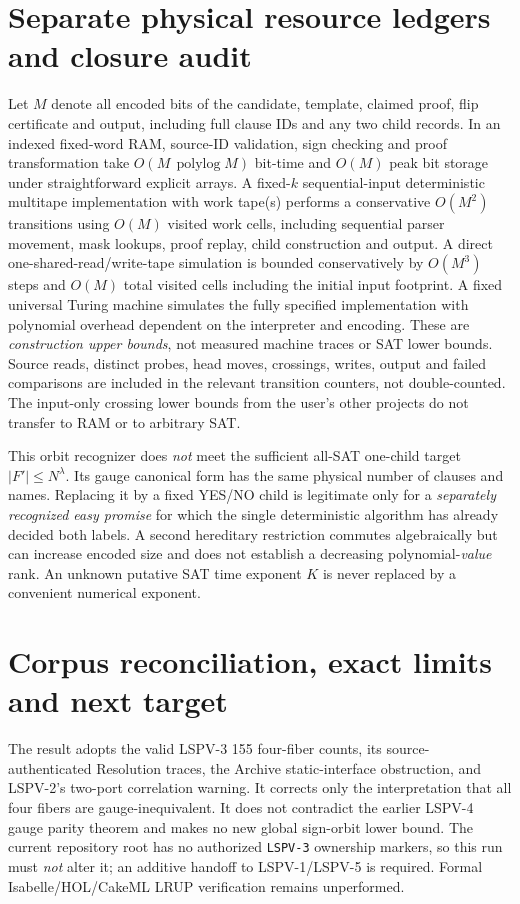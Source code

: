 \documentclass[11pt]{article}
\begin{document}
\section{Separate physical resource ledgers and closure audit}
Let $M$ denote all encoded bits of the candidate, template, claimed proof, flip certificate and output, including full clause IDs and any two child records. In an indexed fixed-word RAM, source-ID validation, sign checking and proof transformation take $O(M\,\operatorname{polylog}M)$ bit-time and $O(M)$ peak bit storage under straightforward explicit arrays. A fixed-$k$ sequential-input deterministic multitape implementation with work tape(s) performs a conservative $O(M^2)$ transitions using $O(M)$ visited work cells, including sequential parser movement, mask lookups, proof replay, child construction and output. A direct one-shared-read/write-tape simulation is bounded conservatively by $O(M^3)$ steps and $O(M)$ total visited cells including the initial input footprint. A fixed universal Turing machine simulates the fully specified implementation with polynomial overhead dependent on the interpreter and encoding. These are \emph{construction upper bounds}, not measured machine traces or SAT lower bounds. Source reads, distinct probes, head moves, crossings, writes, output and failed comparisons are included in the relevant transition counters, not double-counted. The input-only crossing lower bounds from the user's other projects do not transfer to RAM or to arbitrary SAT.

This orbit recognizer does \emph{not} meet the sufficient all-SAT one-child target $|F'|\le N^\lambda$. Its gauge canonical form has the same physical number of clauses and names. Replacing it by a fixed YES/NO child is legitimate only for a \emph{separately recognized easy promise} for which the single deterministic algorithm has already decided both labels. A second hereditary restriction commutes algebraically but can increase encoded size and does not establish a decreasing polynomial-\emph{value} rank. An unknown putative SAT time exponent $K$ is never replaced by a convenient numerical exponent.

\section{Corpus reconciliation, exact limits and next target}
The result adopts the valid LSPV-3 155 four-fiber counts, its source-authenticated Resolution traces, the Archive static-interface obstruction, and LSPV-2's two-port correlation warning. It corrects only the interpretation that all four fibers are gauge-inequivalent. It does not contradict the earlier LSPV-4 gauge parity theorem and makes no new global sign-orbit lower bound. The current repository root  has no authorized \texttt{LSPV-3} ownership markers, so this run must \emph{not} alter it; an additive handoff to LSPV-1/LSPV-5 is required. Formal Isabelle/HOL/CakeML LRUP verification remains unperformed.
\end{document}
